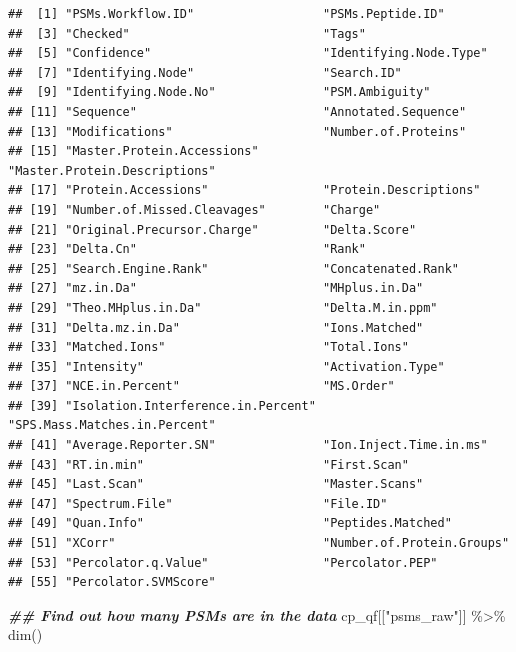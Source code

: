 \documentclass[9pt,a4paper,]{extarticle}
\newenvironment{Shaded}{\begin{snugshade}}{\end{snugshade}}
\newcommand{\DocumentationTok}[1]{\textcolor[rgb]{0.56,0.35,0.01}{\textbf{\textit{#1}}}}
\newcommand{\FunctionTok}[1]{\textcolor[rgb]{0.00,0.00,0.00}{#1}}
\newcommand{\NormalTok}[1]{#1}
\newcommand{\SpecialCharTok}[1]{\textcolor[rgb]{0.00,0.00,0.00}{#1}}
\newcommand{\StringTok}[1]{\textcolor[rgb]{0.31,0.60,0.02}{#1}}
\begin{document}
\begin{verbatim}
##  [1] "PSMs.Workflow.ID"                  "PSMs.Peptide.ID"                  
##  [3] "Checked"                           "Tags"                             
##  [5] "Confidence"                        "Identifying.Node.Type"            
##  [7] "Identifying.Node"                  "Search.ID"                        
##  [9] "Identifying.Node.No"               "PSM.Ambiguity"                    
## [11] "Sequence"                          "Annotated.Sequence"               
## [13] "Modifications"                     "Number.of.Proteins"               
## [15] "Master.Protein.Accessions"         "Master.Protein.Descriptions"      
## [17] "Protein.Accessions"                "Protein.Descriptions"             
## [19] "Number.of.Missed.Cleavages"        "Charge"                           
## [21] "Original.Precursor.Charge"         "Delta.Score"                      
## [23] "Delta.Cn"                          "Rank"                             
## [25] "Search.Engine.Rank"                "Concatenated.Rank"                
## [27] "mz.in.Da"                          "MHplus.in.Da"                     
## [29] "Theo.MHplus.in.Da"                 "Delta.M.in.ppm"                   
## [31] "Delta.mz.in.Da"                    "Ions.Matched"                     
## [33] "Matched.Ions"                      "Total.Ions"                       
## [35] "Intensity"                         "Activation.Type"                  
## [37] "NCE.in.Percent"                    "MS.Order"                         
## [39] "Isolation.Interference.in.Percent" "SPS.Mass.Matches.in.Percent"      
## [41] "Average.Reporter.SN"               "Ion.Inject.Time.in.ms"            
## [43] "RT.in.min"                         "First.Scan"                       
## [45] "Last.Scan"                         "Master.Scans"                     
## [47] "Spectrum.File"                     "File.ID"                          
## [49] "Quan.Info"                         "Peptides.Matched"                 
## [51] "XCorr"                             "Number.of.Protein.Groups"         
## [53] "Percolator.q.Value"                "Percolator.PEP"                   
## [55] "Percolator.SVMScore"
\end{verbatim}

\begin{Shaded}
\begin{Highlighting}[]
\DocumentationTok{\#\# Find out how many PSMs are in the data}
\NormalTok{cp\_qf[[}\StringTok{"psms\_raw"}\NormalTok{]] }\SpecialCharTok{\%\textgreater{}\%}
  \FunctionTok{dim}\NormalTok{()}
\end{Highlighting}
\end{Shaded}
\end{document}
